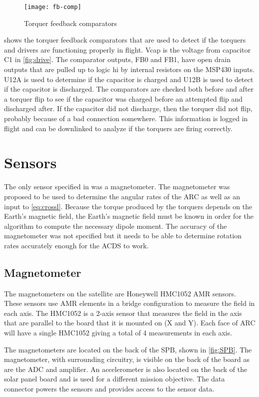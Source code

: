 \begin{figure}[htb!]
    \centering
    \texttt{[image: fb-comp]}
    \caption{Torquer feedback comparators}
    \label{fig:fb-comp}
\end{figure}

 shows the torquer feedback comparators that are used to detect if the torquers and drivers are functioning properly in flight. Vcap is the voltage from capacitor C1 in \cref{fig:drive}. The comparator outputs, FB0 and FB1, have open drain outputs that are pulled up to logic hi by internal resistors on the MSP430 inputs. U12A  is used to determine if the capacitor is charged and U12B is used to detect if the capacitor is discharged. The comparators are checked both before and after a torquer flip to see if the capacitor was charged before an attempted flip and discharged after. If the capacitor did not discharge, then the torquer did not flip, probably because of a bad connection somewhere. This information is logged in flight and can be downlinked to analyze if the torquers are firing correctly.

\section{Sensors}

The only sensor specified in \cite{Mentch11} was a magnetometer. The magnetometer was proposed to be used to determine the angular rates of the \ac{ARC} as well as an input to \cref{eq:crossl}. Because the torque produced by the torquers depends on the Earth's magnetic field, the Earth's magnetic field must be known in order for the algorithm to compute the necessary dipole moment. The accuracy of the magnetometer was not specified but it needs to be able to determine rotation rates accurately enough for the \ac{ACDS} to work.

\subsection{Magnetometer}

The magnetometers on the satellite are Honeywell HMC1052 \ac{AMR} sensors. These sensors use \ac{AMR} elements in a bridge configuration to measure the field in each axis. The HMC1052 is a 2-axis sensor that measures the field in the axis that are parallel to the board that it is mounted on (X and Y). Each face of \ac{ARC} will have a single HMC1052 giving a total of 4 measurements in each axis.

The magnetometers are located on the back of the \acs{SPB}, shown in \cref{fig:SPB}. The magnetometer, with surrounding circuitry, is visible on the back of the board as are the \ac{ADC} and amplifier. An accelerometer is also located on the back of the solar panel board and is used for a different mission objective. The data connector powers the sensors and provides access to the sensor data.

